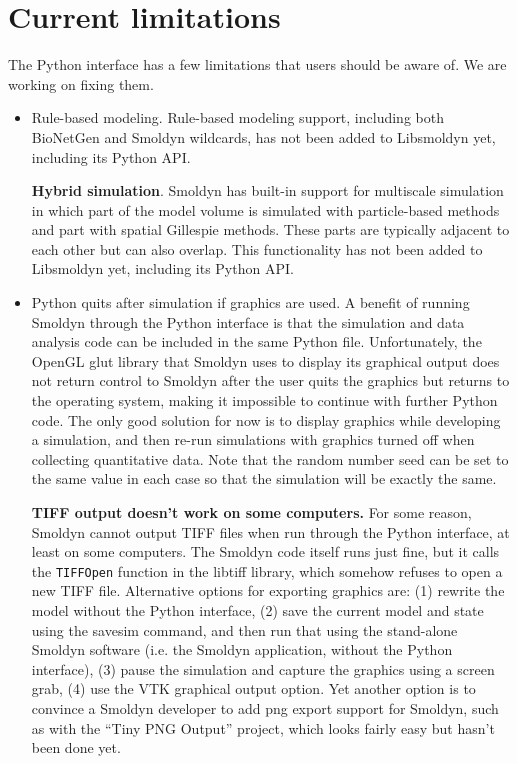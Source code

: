 \documentclass {book}
\newcommand {\ttt} {\texttt}
\begin{document}
\section{Current limitations}

The Python interface has a few limitations that users should be aware of. We are working on fixing them.

\begin{itemize}

\item{Rule-based modeling}. Rule-based modeling support, including both BioNetGen and Smoldyn wildcards, has not been added to Libsmoldyn yet, including its Python API.

\textbf{Hybrid simulation}. Smoldyn has built-in support for multiscale simulation in which part of the model volume is simulated with particle-based methods and part with spatial Gillespie methods. These parts are typically adjacent to each other but can also overlap. This functionality has not been added to Libsmoldyn yet, including its Python API.

\item{Python quits after simulation if graphics are used}. A benefit of running Smoldyn through the Python interface is that the simulation and data analysis code can be included in the same Python file. Unfortunately, the OpenGL glut library that Smoldyn uses to display its graphical output does not return control to Smoldyn after the user quits the graphics but returns to the operating system, making it impossible to continue with further Python code. The only good solution for now is to display graphics while developing a simulation, and then re-run simulations with graphics turned off when collecting quantitative data. Note that the random number seed can be set to the same value in each case so that the simulation will be exactly the same.

\textbf{TIFF output doesn't work on some computers.} For some reason, Smoldyn cannot output TIFF files when run through the Python interface, at least on some computers. The Smoldyn code itself runs just fine, but it calls the \ttt{TIFFOpen} function in the libtiff library, which somehow refuses to open a new TIFF file. Alternative options for exporting graphics are: (1) rewrite the model without the Python interface, (2) save the current model and state using the savesim command, and then run that using the stand-alone Smoldyn software (i.e. the Smoldyn application, without the Python interface), (3) pause the simulation and capture the graphics using a screen grab, (4) use the VTK graphical output option. Yet another option is to convince a Smoldyn developer to add png export support for Smoldyn, such as with the ``Tiny PNG Output'' project, which looks fairly easy but hasn't been done yet.

\end{itemize}
\end{document}
